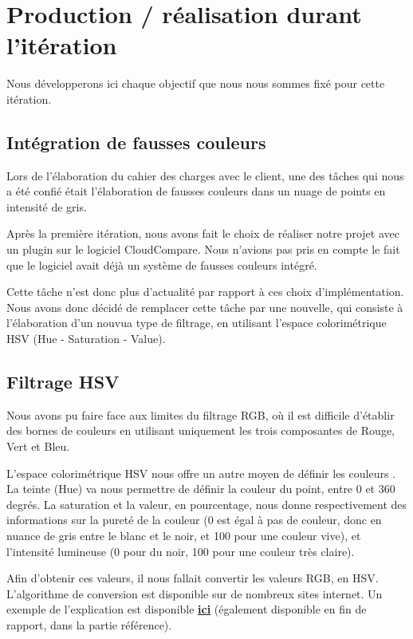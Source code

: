\documentclass[12pt,titlepage,french]{article}
\begin{document}
\section{Production / réalisation durant l'itération}

Nous développerons ici chaque objectif que nous nous sommes fixé pour cette itération.

\subsection{Intégration de fausses couleurs}

Lors de l'élaboration du cahier des charges avec le client, une des tâches qui nous a été confié était l'élaboration de fausses couleurs dans un nuage de points en intensité de gris. \newline

Après la première itération, nous avons fait le choix de réaliser notre projet avec un plugin sur le logiciel CloudCompare. Nous n'avions pas pris en compte le fait que le logiciel avait déjà un système de fausses couleurs intégré. \newline

Cette tâche n'est donc plus d'actualité par rapport à ces choix d'implémentation. Nous avons donc décidé de remplacer cette tâche par une nouvelle, qui consiste à l'élaboration d'un nouvua type de filtrage, en utilisant l'espace colorimétrique HSV (Hue - Saturation - Value).

\subsection{Filtrage HSV}

Nous avons pu faire face aux limites du filtrage RGB, où il est difficile d'établir des bornes de couleurs en utilisant uniquement les trois composantes de Rouge, Vert et Bleu. \newline

L'espace colorimétrique HSV nous offre un autre moyen de définir les couleurs .  La teinte (Hue) va nous permettre de définir la couleur du point, entre 0 et 360 degrés. La saturation et la valeur, en pourcentage, nous donne respectivement des informations sur la pureté de la couleur (0 est égal à pas de couleur, donc en nuance de gris entre le blanc et le noir, et 100 pour une couleur vive), et l'intensité lumineuse (0 pour du noir, 100 pour une couleur très claire). \newline

Afin d'obtenir ces valeurs, il nous fallait convertir les valeurs RGB, en HSV. L'algorithme de conversion est disponible sur de nombreux sites internet. Un exemple de l'explication est disponible \href{https://mattlockyer.github.io/iat455/documents/rgb-hsv.pdf}{\textbf{ici}} (également disponible en fin de rapport, dans la partie référence). \newline
\end{document}
